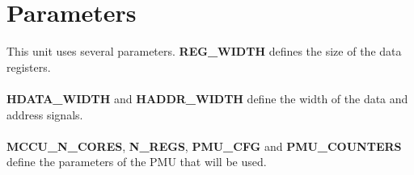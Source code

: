 \section{Parameters}
\label{chapter3}
This unit uses several parameters. \textbf{REG\_WIDTH} defines the size of the data registers.\\
\\
\textbf{HDATA\_WIDTH} and \textbf{HADDR\_WIDTH} define the width of the data and address signals.\\
\\
\textbf{MCCU\_N\_CORES}, \textbf{N\_REGS}, \textbf{PMU\_CFG} and \textbf{PMU\_COUNTERS} define the parameters of the PMU that will be used.
